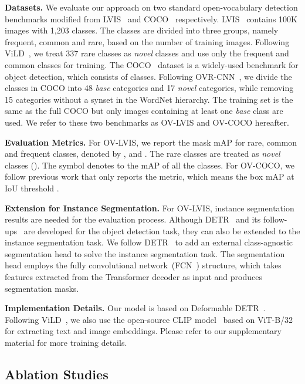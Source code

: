 \documentclass[runningheads]{llncs}
\begin{document}
\noindent \textbf{Datasets.}
We evaluate our approach on two standard open-vocabulary detection benchmarks modified from LVIS~\cite{gupta2019lvis} and COCO~\cite{lin2014microsoft} respectively. LVIS~\cite{gupta2019lvis} contains 100K images with 1,203 classes. The classes are divided into three groups, namely frequent, common and rare, based on the number of training images. Following ViLD~\cite{gu2021open}, we treat 337 rare classes as \emph{novel} classes and use only the frequent and common classes for training. The COCO~\cite{lin2014microsoft} dataset is a widely-used benchmark for object detection, which consists of  classes. Following OVR-CNN~\cite{zareian2021open}, we divide the classes in COCO into 48 \emph{base} categories and 17 \emph{novel} categories, while removing 15 categories without a synset in the WordNet hierarchy. The training set is the same as the full COCO but only images containing at least one \emph{base} class are used. We refer to these two benchmarks as OV-LVIS and OV-COCO hereafter.

\noindent \textbf{Evaluation Metrics.}
For OV-LVIS, we report the mask mAP for rare, common and frequent classes, denoted by ,  and . The rare classes are treated as \emph{novel} classes (). The symbol  denotes to the mAP of all the classes. For OV-COCO, we follow previous work that only reports the  metric, which means the box mAP at IoU threshold .

\noindent \textbf{Extension for Instance Segmentation.}
For OV-LVIS, instance segmentation results are needed for the evaluation process. Although DETR~\cite{carion2020end} and its follow-ups~\cite{zhu2020deformable,meng2021conditional} are developed for the object detection task, they can also be extended to the instance segmentation task. We follow DETR~\cite{carion2020end} to add an external class-agnostic segmentation head to solve the instance segmentation task. The segmentation head employs the fully convolutional network~(FCN~\cite{long2015fully}) structure, which takes features extracted from the Transformer decoder as input and produces segmentation masks.

\noindent \textbf{Implementation Details.}
Our model is based on Deformable DETR~\cite{zhu2020deformable}.
Following ViLD~\cite{gu2021open}, we also use the open-source CLIP model~\cite{radford2021learning} based on ViT-B/32 for extracting text and image embeddings.
Please refer to our supplementary material for more training details.

\subsection{Ablation Studies}\label{sec:ablation}
\end{document}
